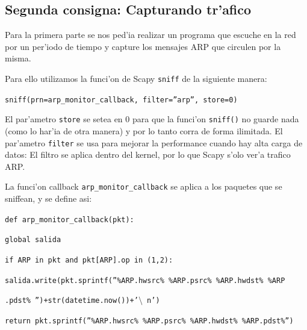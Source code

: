 \documentclass[a4paper,10pt]{article}
\begin{document}
\subsection{Segunda consigna: Capturando tr'afico}
\label{expli1:}

Para la primera parte se nos ped'ia realizar un programa que escuche en la red por un per'iodo de tiempo y capture los mensajes ARP que circulen por la misma.

\vspace*{5 mm}

Para ello utilizamos la funci'on de Scapy \texttt{sniff} de la siguiente manera:

\vspace*{5 mm}

\texttt{sniff(prn=arp\_monitor\_callback, filter=''arp'', store=0)}

\vspace*{5 mm}

El par'ametro \texttt{store} se setea en 0 para que la funci'on \texttt{sniff()} no guarde nada (como lo har'ia de otra manera) y por lo tanto corra de forma ilimitada. El par'ametro \texttt{filter} se usa para mejorar la performance cuando hay alta carga de datos: El filtro se aplica dentro del kernel, por lo que Scapy s'olo ver'a trafico ARP.

\vspace*{5 mm}

La funci'on callback \texttt{arp\_monitor\_callback} se aplica a los paquetes que se sniffean, y se define asi:

\vspace*{5 mm}

\texttt{def arp\_monitor\_callback(pkt):}

\hspace*{3 mm}	\texttt{global salida}
	
\hspace*{3 mm}	\texttt{if ARP in pkt and pkt[ARP].op in (1,2):}
		
\hspace*{6 mm}			\texttt{salida.write(pkt.sprintf(''\%ARP.hwsrc\% \%ARP.psrc\% \%ARP.hwdst\% \%ARP}
			
\hspace*{6 mm}			\texttt{.pdst\% '')+str(datetime.now())+'$\setminus$ n')}
			
\hspace*{6 mm}			\texttt{return pkt.sprintf(''\%ARP.hwsrc\% \%ARP.psrc\% \%ARP.hwdst\% \%ARP.pdst\%'')}

\vspace*{5 mm}
\end{document}
